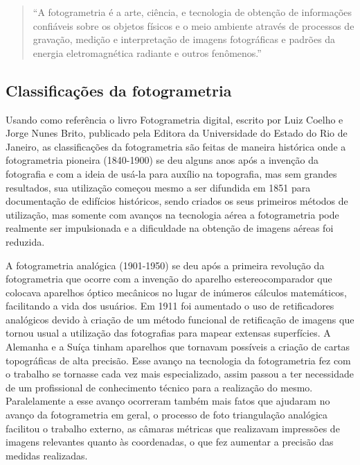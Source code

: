 \begin{quote}
	``A fotogrametria é a arte, ciência, e tecnologia de obtenção de informações confiáveis sobre os objetos físicos e o meio ambiente através de processos de gravação, medição e interpretação de imagens fotográficas e padrões da energia eletromagnética radiante e outros fenômenos.''
\end{quote}

\subsection{Classificações da fotogrametria}
Usando como referência o livro Fotogrametria digital, escrito por Luiz Coelho e Jorge Nunes Brito, publicado pela Editora da Universidade do Estado do Rio de Janeiro, as classificações da fotogrametria são feitas de maneira histórica onde a fotogrametria pioneira (1840-1900) se deu alguns anos após a invenção da fotografia e com a ideia de usá-la para auxílio na topografia, mas sem grandes resultados, sua utilização começou mesmo a ser difundida em 1851 para documentação de edifícios históricos, sendo criados os seus primeiros métodos de utilização, mas somente com avanços na tecnologia aérea a fotogrametria pode realmente ser impulsionada e a dificuldade na obtenção de imagens aéreas foi reduzida. 

A fotogrametria analógica (1901-1950) se deu após a primeira revolução da fotogrametria que ocorre com a invenção do aparelho estereocomparador que colocava aparelhos óptico mecânicos no lugar de inúmeros cálculos matemáticos, facilitando a vida dos usuários. Em 1911 foi aumentado o uso de retificadores analógicos devido à criação de um método funcional de retificação de imagens que tornou usual a utilização das fotografias para mapear extensas superfícies. A Alemanha e a Suíça tinham aparelhos que tornavam possíveis a criação de cartas topográficas de alta precisão. Esse avanço na tecnologia da fotogrametria fez com o trabalho se tornasse cada vez mais especializado, assim passou a ter necessidade de um profissional de conhecimento técnico para a realização do mesmo. Paralelamente a esse avanço ocorreram também mais fatos que ajudaram no avanço da fotogrametria em geral, o processo de foto triangulação analógica facilitou o trabalho externo, as câmaras métricas que realizavam impressões de imagens relevantes quanto às coordenadas, o que fez aumentar a precisão das medidas realizadas.

